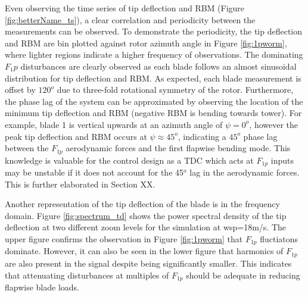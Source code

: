 Even observing the time series of tip deflection and RBM (Figure \ref{fig:betterName_ts}), a clear correlation and periodicity between the measurements can be observed. To demonstrate the periodicity, the tip deflection and RBM are bin plotted against rotor azimuth angle in Figure \ref{fig:1pworm}, where lighter regions indicate a higher frequency of observations. The dominating $F_1p$ disturbances are clearly observed as each blade follows an almost sinusoidal distribution for tip deflection and RBM. As expected, each blade measurement is offset by $120^o$ due to three-fold rotational symmetry of the rotor. Furthermore, the phase lag of the system can be approximated by observing the location of the minimum tip deflection and RBM (negative RBM is bending towards tower). For example, blade 1 is vertical upwards at an azimuth angle of $\psi=0^o$, however the peak tip deflection and RBM occurs at $\psi\approx45^o$, indicating a $45^o$ phase lag between the $F_{1p}$ aerodynamic forces and the first flapwise bending mode. This knowledge is valuable for the control design as a TDC which acts at $F_{1p}$ inputs may be unstable if it does not account for the 45$^o$ lag in the aerodynamic forces. This is further elaborated in Section XX. 


Another representation of the tip deflection of the blade is in the frequency domain. Figure \ref{fig:spectrum_td} shows the power spectral density of the tip deflection at two different zoom levels for the simulation at wsp=18m/s. The upper figure confirms the observation in Figure \ref{fig:1pworm} that $F_{1p}$ fluctiatons dominate. However, it can also be seen in the lower figure that harmonics of $F_{1p}$ are also present in the signal despite being significantly smaller. This indicates that attenuating disturbances at multiples of $F_{1p}$ should be adequate in reducing flapwise blade loads.



